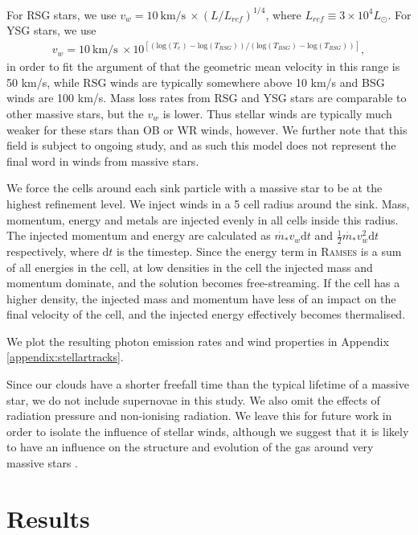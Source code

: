 \documentclass[a4paper,fleqn,usenatbib]{mnras}
\begin{document}
For RSG stars, we use $v_w = 10 \mathrm{~km/s~} \times (L/L_{ref})^{1/4}$, where $L_{ref} \equiv 3 \times 10^4 L_{\odot}$. For YSG stars, we use  
\begin{equation}
\begin{aligned}
v_w = 10 \mathrm{~km/s~} \times 10^{[(\mathrm{log}(T_e) - \mathrm{log}(T_{RSG})) / (\mathrm{log}(T_{BSG}) - \mathrm{log}(T_{RSG}))]},
\end{aligned}
\end{equation}
in order to fit the argument of \citet{Gatto2017} that the geometric mean velocity in this range is 50 km/s, while RSG winds are typically somewhere above 10 km/s and BSG winds are 100 km/s. Mass loss rates from RSG and YSG stars are comparable to other massive stars, but the $v_w$ is lower. Thus stellar winds are typically much weaker for these stars than OB or WR winds, however. We further note that this field is subject to ongoing study, and as such this model does not represent the final word in winds from massive stars.

We force the cells around each sink particle with a massive star to be at the highest refinement level. We inject winds in a 5 cell radius around the sink. Mass, momentum, energy and metals are injected evenly in all cells inside this radius. The injected momentum and energy are calculated as $\dot{m_*} v_w \mathrm{d}t$ and $\frac{1}{2} \dot{m_*} v_w^2 \mathrm{d}t$ respectively, where $\mathrm{d}t$ is the timestep. Since the energy term in \textsc{Ramses} is a sum of all energies in the cell, at low densities in the cell the injected mass and momentum dominate, and the solution becomes free-streaming. If the cell has a higher density, the injected mass and momentum have less of an impact on the final velocity of the cell, and the injected energy effectively becomes thermalised.

We plot the resulting photon emission rates and wind properties in Appendix \ref{appendix:stellartracks}.

Since our clouds have a shorter freefall time than the typical lifetime of a massive star, we do not include supernovae in this study. We also omit the effects of radiation pressure and non-ionising radiation. We leave this for future work in order to isolate the influence of stellar winds, although we suggest that it is likely to have an influence on the structure and evolution of the gas around very massive stars \citep[see][]{Geen2019}.

\section{Results}
\label{results}
\end{document}
